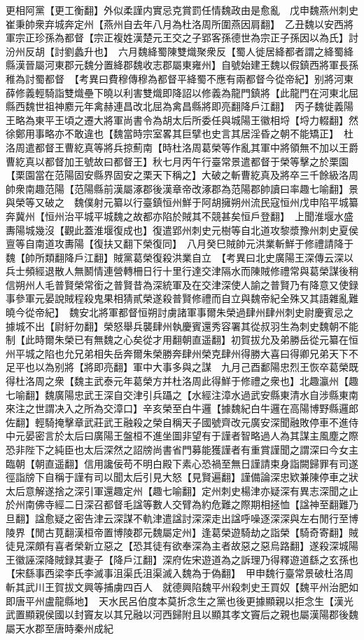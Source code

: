 更相阿黨【更工衡翻】外似柔謹内實忌克賞罰任情魏政由是愈亂　戊申魏燕州刺史崔秉帥衆弃城奔定州【燕州自去年八月為杜洛周所圍燕因肩翻】　乙丑魏以安西將軍宗正珍孫為都督【宗正複姓漢楚元王交之子郢客孫德世為宗正子孫因以為氏】討汾州反胡【討劉蠡升也】　六月魏絳蜀陳雙熾聚衆反【蜀人徙居絳都者謂之絳蜀絳縣漢晉屬河東郡元魏分置絳郡魏收志郡屬東雍州】自號始建王魏以假鎮西將軍長孫稚為討蜀都督　【考異曰費穆傳穆為都督平絳蜀不應有兩都督今從帝紀】别將河東薛修義輕騎詣雙熾壘下曉以利害雙熾即降詔以修義為龍門鎮將【此龍門在河東北屈縣西魏世祖神䴥元年禽赫連昌改北屈為禽昌縣將即亮翻降戶江翻】　丙子魏徙義陽王略為東平王頃之遷大將軍尚書令為胡太后所委任與城陽王徽相埒【埒力輟翻】然徐鄭用事略亦不敢違也【魏當時宗室畧其巨擘也史言其居淫昏之朝不能矯正】　杜洛周遣都督王曹紇真等將兵掠薊南【時杜洛周葛榮等作亂其軍中將領無不加以王爵曹紇真以都督加王號故曰都督王】秋七月丙午行臺常景遣都督于榮等擊之於栗園【栗園當在范陽固安縣界固安之栗天下稱之】大破之斬曹紇真及將卒三千餘級洛周帥衆南趣范陽【范陽縣前漢屬涿郡後漢章帝改涿郡為范陽郡帥讀曰率趣七喻翻】景與榮等又破之　魏僕射元纂以行臺鎮恒州鮮于阿胡擁朔州流民寇恒州戊申陷平城纂奔冀州【恒州治平城平城魏之故都亦陷於賊其不競甚矣恒戶登翻】　上聞淮堰水盛夀陽城幾沒【觀此蓋淮堰復成也】復遣郢州刺史元樹等自北道攻黎漿豫州刺史夏侯亶等自南道攻夀陽【復扶又翻下榮復同】　八月癸巳賊帥元洪業斬鮮于修禮請降于魏【帥所類翻降戶江翻】賊黨葛榮復殺洪業自立　【考異曰北史廣陽王深傳云深以兵士頻經退散人無鬭情連營轉柵日行十里行達交津隔水而陳賊修禮常與葛榮謀後稍信朔州人毛普賢榮常銜之普賢昔為深統軍及在交津深使人諭之普賢乃有降意又使録事參軍元晏說賊程殺鬼果相猜貳榮遂殺普賢修禮而自立與魏帝紀全殊又其語雜亂難曉今從帝紀】　魏安北將軍都督恒朔討虜諸軍事爾朱榮過肆州肆州刺史尉慶賓忌之據城不出【尉紆勿翻】榮怒舉兵襲肆州執慶賓還秀容署其從叔羽生為刺史魏朝不能制【此時爾朱榮已有無魏之心矣從才用翻朝直遥翻】初賀拔允及弟勝岳從元纂在恒州平城之陷也允兄弟相失岳奔爾朱榮勝奔肆州榮克肆州得勝大喜曰得卿兄弟天下不足平也以為别將【將即亮翻】軍中大事多與之謀　九月己酉鄱陽忠烈王恢卒葛榮既得杜洛周之衆【魏主武泰元年葛榮方并杜洛周此得鮮于修禮之衆也】北趣瀛州【趣七喻翻】魏廣陽忠武王深自交津引兵躡之【水經注漳水過武安縣東清水自涉縣東南來注之世謂决入之所為交漳口】辛亥榮至白牛邏【據魏紀白牛邏在高陽博野縣邏郎佐翻】輕騎掩擊章武莊武王融殺之榮自稱天子國號齊改元廣安深聞融敗停車不進侍中元晏密言於太后曰廣陽王盤桓不進坐圖非望有于謹者智略過人為其謀主風塵之際恐非陛下之純臣也太后深然之詔牓尚書省門募能獲謹者有重賞謹聞之謂深曰今女主臨朝【朝直遥翻】信用讒佞苟不明白殿下素心恐禍至無日謹請束身詣闕歸罪有司遂徑詣牓下自稱于謹有司以聞太后引見大怒【見賢遍翻】謹備論深忠欵兼陳停車之狀太后意解遂捨之深引軍還趣定州【趣七喻翻】定州刺史楊津亦疑深有異志深聞之止於州南佛寺經二日深召都督毛諡等數人交臂為約危難之際期相拯恤【諡神至翻難乃旦翻】諡愈疑之密告津云深謀不軌津遣諡討深深走出諡呼噪逐深深與左右閒行至博陵界【閒古莧翻漢桓帝置博陵郡元魏屬定州】逢葛榮遊騎劫之詣榮【騎奇寄翻】賊徒見深頗有喜者榮新立惡之【恐其徒有欲奉深為主者故惡之惡烏路翻】遂殺深城陽王徽誣深降賊録其妻子【降戶江翻】深府佐宋遊道為之訴理乃得釋遊道繇之玄孫也【宋繇事西梁李氏李滅事沮渠氏沮渠滅入魏為于偽翻】　甲申魏行臺常景破杜洛周斬其武川王賀拔文興等捕虜四百人　就德興陷魏平州殺刺史王買奴【魏平州治肥如即唐平州盧龍縣地】　天水民呂伯度本莫折念生之黨也後更據顯親以拒念生【漢光武置顯親侯國以封竇友以其兄融以河西歸附且以顯其孝文竇后之親也屬漢陽郡後魏屬天水郡至唐時秦州成紀